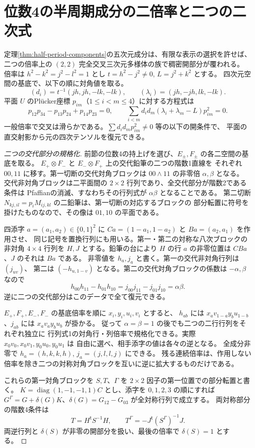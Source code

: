 \section{位数4の半周期成分の二倍率と二つの二次式}
\label{sec:half-period-two-quadrics}
\begin{theorem}\label{thm:half-period-two-quadrics}
定理\ref{thm:half-period-components}の五次元成分は、有限な表示の選択を許せば、
二つの倍率上の $(2,2)$ 完全交叉三次元多様体の族で稠密開部分が覆われる。
倍率は $h^2-k^2=j^2-l^2=1$ とし $t=h^2-j^2\ne0$, $L=j^2+k^2$ とする。
四次元空間の基底で、以下の順に対角値を取る。
\[
 (d_i)=t^{-1}(jh,jh,-lk,-lk),\qquad
 (\lambda_i)=(jh,-jh,lk,-lk).
\]
平面 $U$ のPlücker座標 $p_{im}$（$1\le i<m\le4$）に対する方程式は
\[
 p_{12}p_{34}-p_{13}p_{24}+p_{14}p_{23}=0,\qquad
 \sum_{i<m}d_i d_m(\lambda_i+\lambda_m-L)p_{im}^2=0 .
\]
一般倍率で交叉は滑らかである。$\sum d_i d_m p_{im}^2\ne0$ 等の以下の開条件で、
平面の直交射影から元の四次テンソルを復元できる。
\end{theorem}
\begin{proof}[二つの交代部分の規格化]
前節の位数4の持上げを選び、$E_\pm,F_\pm$ の各二空間の基底を取る。
$E_+\otimes F_-$ と $E_-\otimes F_+$ 上の交代鉛筆の二つの階数1直線を
それぞれ $00,11$ に移す。第一切断の交代対角ブロックは
$00\wedge11$ の非零倍 $\alpha,\beta$ となる。
交代非対角ブロックは二平面間の $2\times2$ 行列であり、全交代部分が階数2である条件は
Pfaffianの消滅、すなわちその行列式が $\alpha\beta$ となることである。
第二切断 $N_{kj,il}=p_i M_{ij,kl}$ の二鉛筆は、第一切断の対応するブロックの
部分転置に符号を掛けたものなので、その像は $01,10$ の平面である。

四添字 $a=(a_1,a_2)\in\{0,1\}^2$ に $C a=(1-a_1,1-a_2)$ と $Ba=(a_2,a_1)$ を作用させ、
同じ記号を置換行列にも用いる。第一・第二の対称な八次ブロックの非対角 $4\times4$ 行列を
$H,J$ とする。鉛筆の台により $H$ の行 $a$ の非零位置は $CBa$、$J$ のそれは $Ba$ である。
非零値を $h_a,j_a$ と書く。第一の交代非対角行列は $(j_{uv})$、
第二は $(-h_{u,1-v})$ となる。第二の交代対角ブロックの係数は $-\alpha,\beta$ なので
\[
 h_{00}h_{11}-h_{01}h_{10}=j_{00}j_{11}-j_{01}j_{10}=\alpha\beta .
\]
逆に二つの交代部分はこのデータで全て復元できる。

$E_+,F_+,E_-,F_-$ の基底倍率を順に $x_i,y_i,u_i,v_i$ とすると、
$h_{ab}$ には $x_a v_{1-a}y_bu_{1-b}$、$j_{ab}$ には $x_a v_a y_bu_b$ が掛かる。
従って $\alpha=\beta=1$ の後でも二つの二行行列をそれぞれ独立に
行列式1の対角行・列倍率で規格化できる。実際 $x_0v_0,x_0v_1,y_0u_0,y_0u_1$ は
自由に選べ、相手添字の値は各々の逆となる。
全成分非零で $h_a=(h,k,k,h)$, $j_a=(j,l,l,j)$ にできる。
残る連続倍率は、作用しない倍率を除き二つの対称対角ブロックを互いに逆に拡大するものだけである。

これらの第一対角ブロックを $S,T$、$\Gamma$ を $2\times2$ 因子の第一位置での部分転置と書く。
$K=\operatorname{diag}(1,-1,-1,1)C$ とし、添字を $0,1,2,3$ の順にすれば
$G^\Gamma=G+\delta(G)K$、$\delta(G)=G_{12}-G_{03}$ が全対称行列で成立する。
両対称部分の階数4条件は
\[
 T=H^{\mathsf t}S^{-1}H,\qquad
 T^\Gamma=-J^{\mathsf t}(S^\Gamma)^{-1}J .
\]
両逆行列と $\delta(S)$ が非零の開部分を扱い、最後の倍率で $\delta(S)=1$ とする。
\end{proof}

